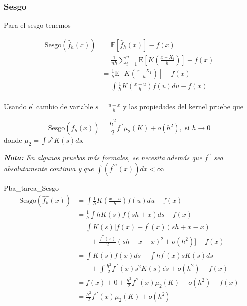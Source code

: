 \documentclass[12pt]{book}\usepackage[]{graphicx}\usepackage[]{color}
\theoremstyle{definition}
\theoremstyle{plain}
\begin{document}
\newpage

\subsubsection{Sesgo}

Para el sesgo tenemos

\begin{align*}
	\mathrm{Sesgo}\left(\hat{f}_{h}(x)\right)
	  & = \mathbb{E}\left[\hat{f}_{h}(x)\right]-f(x)                                                  \\
	  & = \frac{1}{nh} \sum_{i=1}^{n} \mathrm{E}\left[K\left( \frac{x-X_{i}}{h} \right)\right] - f(x) \\
	  & = \frac{1}{h}\mathrm{E}\left[K\left( \frac{x-X_{1}}{h} \right)\right] - f(x)                  \\
	  & = \int \frac{1}{h} K\left( \frac{x-u}{h}\right)f(u)du -f(x)                                   \\
\end{align*}

\begin{tarea}{}{}
	Usando el cambio de variable \(s=\frac{u-x}{h}\) y las propiedades del kernel pruebe que

	\begin{equation*}
		\mathrm{Sesgo}\left(\hat{f}_{h}(x)\right) = \frac{h^{2}}{2} f^{\prime\prime} \mu_{2}(K) + o(h^{2}), \text{ si } h\to 0
	\end{equation*}
	donde \(\mu_{2}=\int s^{2}K(s)ds\).

	\emph{\textbf{Nota:} En algunas pruebas más formales, se necesita
	además que  $f^{\prime\prime}$ sea absolutamente continua y que
	$\int(f^{\prime\prime\prime}(x))dx<\infty$.}
\end{tarea}

\begin{solucion}{}{Pba_tarea_Sesgo}
	\begin{align*}
\mathrm{Sesgo}(\hat{f_{h}}(x)) & = \int \frac{1}{h} K\left( \frac{x-u}{h} \right) f(u)du - f(x)		\\
& = \frac{1}{h} \int hK(s)f(sh+x) ds - f(x) \\
 & = \int K(s)\Biggl[ f(x) + f^{\prime}(x)(sh+x-x)  \\
 &  \qquad  + \frac{f^{\prime\prime}(x)}{2}(sh+x-x)^2 + o(h^{2}) \Biggr] - f(x) \\
 & = \int K(s)f(x)ds + \int hf^{\prime}(x)sK(s) ds  \\
 & \qquad  + \int \frac{h^2}{2} f^{\prime\prime}(x)s^2K(s) ds + o(h^2) - f(x) \\
 & = f(x) + 0 + \frac{h^2}{2}f^{\prime\prime}(x)\mu_{2}(K) + o(h^2) - f(x)	\\
 & = \frac{h^2}{2}f^{\prime\prime}(x)\mu_{2}(K) + o(h^2) \\
	\end{align*}
\end{solucion}
\end{document}
